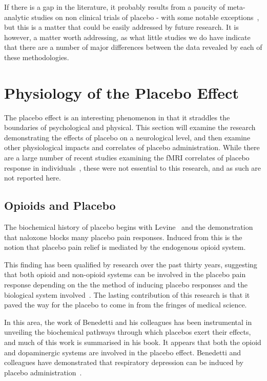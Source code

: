 If there is a gap in the literature, it probably results from a paucity of meta-analytic studies on non clinical trials of placebo - with some notable exceptions~\cite{Wampol2007,Vase2002}, but this is a matter that could be easily addressed by future research. It is however, a matter worth addressing, as what little studies we do have indicate that there are a number of major differences between the data revealed by each of these methodologies. 






\section{Physiology of the Placebo Effect}
\label{sec:neur-plac-effect}


The placebo effect is an interesting phenomenon in that it straddles the boundaries of psychological and physical. This section will examine the research demonstrating the effects of placebo on a neurological level, and then examine other physiological impacts and correlates of placebo administration. While there are a large number of recent studies examining the fMRI correlates of placebo response in individuals~\cite{Benedetti2005a}, these were not essential to this research, and as such are not reported here. 


\subsection{Opioids and Placebo}
\label{sec:opiods-placebo}

The biochemical history of placebo begins with Levine~\cite{Levine1978a} and the demonstration that naloxone blocks many placebo pain responses. Induced from this is the notion that placebo pain relief is mediated by the endogenous opioid system. 

This finding has been qualified by research over the past thirty years, suggesting that both opioid and non-opioid systems can be involved in the placebo pain response depending on the the method of inducing placebo responses and the biological system involved~\cite{Amanzio2001,benedetti2003a}. The lasting contribution of this research is that it paved the way for the placebo to come in from the fringes of medical science.

In this area, the work of Benedetti and his colleagues has been instrumental in unveiling the biochemical pathways through which placebos exert their effects, and much of this work is summarised in his book.  It appears that both the opioid and dopaminergic systems are involved in the placebo effect.  Benedetti and colleagues have demonstrated that respiratory depression can be induced by placebo administration~\cite{Benedetti1999a}. 

